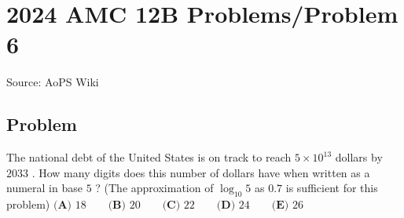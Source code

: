 \documentclass[12pt]{article}
\begin{document}
\section*{{2024 AMC 12B Problems/Problem 6}}
Source: AoPS Wiki

\subsection*{Problem}
The national debt of the United States is on track to reach $5\times10^{13}$ dollars by $2033$ . How many digits does this number of dollars have when written as a numeral in base $5$ ? (The approximation of $\log_{10} 5$ as $0.7$ is sufficient for this problem) $\textbf{(A) } 18 \qquad\textbf{(B) } 20 \qquad\textbf{(C) } 22 \qquad\textbf{(D) } 24 \qquad\textbf{(E) } 26$
\end{document}
